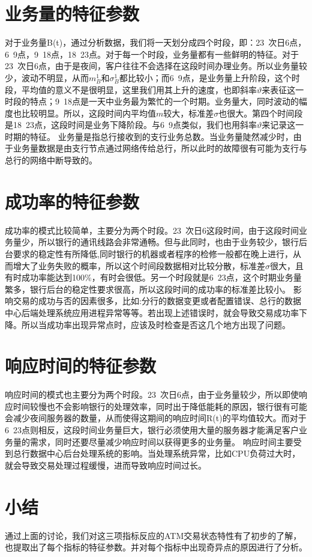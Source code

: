 \documentclass[a4paper]{article}
\begin{document}
\section{业务量的特征参数}
\indent 对于业务量B(t)，通过分析数据，我们将一天划分成四个时段，即：23~次日6点，6~9点，9~18点，18~23点。对于每一个时段，业务量都有一些鲜明的特征。对于23~次日6点，由于是夜间，客户往往不会选择在这段时间办理业务。所以业务量较少，波动不明显，从而$m_B^1$和$\sigma_B^1$都比较小；而6~9点，是业务量上升阶段，这个时段，平均值的意义不是很明显，这里我们用其上升的速度，也即斜率$\vartheta$来表征这一时段的特点；9~18点是一天中业务最为繁忙的一个时期。业务量大，同时波动的幅度也比较明显。所以，这段时间内平均值$m$较大，标准差$\sigma$也很大。第四个时间段是18~23点，这段时间是业务下降阶段。与6~9点类似，我们也用斜率$\vartheta$来记录这一时期的特征。
\indent 业务量是指总行接收到的支行业务总数。当业务量陡然减少时，由于业务量数据是由支行节点通过网络传给总行，所以此时的故障很有可能为支行与总行的网络中断导致的。
\section{成功率的特征参数}
\indent 成功率的模式比较简单，主要分为两个时段。23~次日6这段时间，由于这段时间业务量少，所以银行的通讯线路会非常通畅。但与此同时，也由于业务较少，银行后台要求的稳定性有所降低,同时银行的机器或者程序的检修一般都在晚上进行，从而增大了业务失败的概率，所以这个时间段数据相对比较分散，标准差$\sigma$很大，且有时成功率能达到100\%，有时会很低。另一个时段就是6~23点，这个时期业务量繁多，银行后台的稳定性要求很高，所以这段时间的成功率的标准差比较小。
\indent 影响交易的成功与否的因素很多，比如:分行的数据变更或者配置错误、总行的数据中心后端处理系统应用进程异常等等。若出现上述错误时，就会导致交易成功率下降。所以当成功率出现异常点时，应该及时检查是否这几个地方出现了问题。
\section{响应时间的特征参数}
\indent 响应时间的模式也主要分为两个时段。23~次日6点，由于业务量较少，所以即使响应时间较慢也不会影响银行的处理效率，同时出于降低能耗的原因，银行很有可能会减少夜间服务器的数量，从而使得这期间的响应时间R(t)的平均值较大。而对于6~23点则相反，这段时间业务量巨大，银行必须使用大量的服务器才能满足客户业务量的需求，同时还要尽量减少响应时间以获得更多的业务量。
\indent 响应时间主要受到总行数据中心后台处理系统的影响。当处理系统异常，比如CPU负荷过大时，就会导致交易处理过程缓慢，进而导致响应时间过长。
\section{小结}
通过上面的讨论，我们对这三项指标反应的ATM交易状态特性有了初步的了解，也提取出了每个指标的特征参数。并对每个指标中出现奇异点的原因进行了分析。
\end{document}

